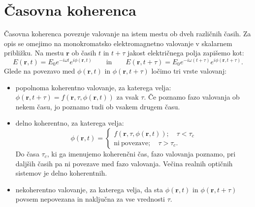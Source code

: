 \section{Časovna koherenca}
Časovna koherenca povezuje valovanje na istem mestu 
ob dveh različnih časih. Za opis se omejimo na monokromatsko elektromagnetno 
valovanje v skalarnem približku. Na mestu $\mathbf{r}$ ob časih $t$ in $t+\tau$ jakost
električnega polja zapišemo kot:
\begin{equation}
E(\mathbf{r}, t) = E_0 e^{-i\omega t} e^{i\phi(\mathbf{r}, t)}
\qquad \mathrm{in} \qquad
E(\mathbf{r}, t+\tau) = E_0 e^{-i\omega (t+\tau)} e^{i\phi(\mathbf{r}, t+\tau)}.
\label{eq:08_03}
\end{equation}
Glede na povezavo med $\phi(\mathbf{r}, t)$ in $\phi(\mathbf{r}, t+\tau)$ 
ločimo tri vrste valovanj:
\begin{itemize}
 \item popolnoma koherentno valovanje, 
 za katerega velja: $\phi(\mathbf{r}, t+\tau) = 
 f(\mathbf{r}, \tau, \phi(\mathbf{r}, t))$ za vsak $\tau$. 
 Če poznamo fazo valovanja ob nekem času, jo poznamo tudi ob vsakem drugem času.
 \item delno koherentno, za katerega velja:
\begin{equation}
\phi(\mathbf{r}, t)=\begin{cases}
f(\mathbf{r}, \tau, \phi(\mathbf{r}, t)); \quad \tau < \tau_c\\
\mathrm{ni~povezave}; \quad \tau > \tau_c.
\end{cases}
\label{eq:08_04}
\end{equation}
Do časa $\tau_c$, ki ga imenujemo koherenčni čas, fazo valovanja
poznamo, pri daljših časih pa ni povezave med fazo valovanja. Večina
realnih optičnih sistemov je delno koherentnih.
 \item nekoherentno valovanje, za katerega velja, da
 sta $\phi(\mathbf{r}, t)$ in $\phi(\mathbf{r}, t+\tau)$
 povsem nepovezana in naključna za vse vrednosti $\tau$.
\end{itemize}

